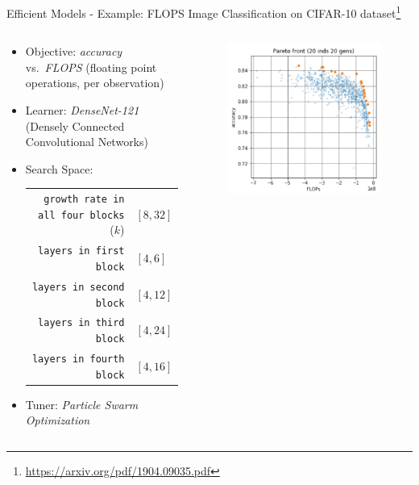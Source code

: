 \begin{frame}{Efficient Models - Example: FLOPS}
Image Classification on CIFAR-10 dataset\footnote{\url{https://arxiv.org/pdf/1904.09035.pdf}}
  \begin{columns}
  \begin{column}{0.65\textwidth}
    \begin{itemize}
      \item Objective: \emph{accuracy} vs.\ \emph{FLOPS} (floating point operations, per observation)
      \item Learner: \emph{DenseNet-121} (Densely Connected Convolutional Networks)
      \item Search Space:\\
        \begin{tabular}{rl}
          \texttt{growth rate in all four blocks} ($k$) & $[8,32]$ \\ %
          \texttt{layers in first block} & $[4, 6]$ \\
          \texttt{layers in second block} & $[4, 12] $ \\
          \texttt{layers in third block} & $[4, 24] $ \\
          \texttt{layers in fourth block} & $[4, 16] $ \\
        \end{tabular}
      \item Tuner: \emph{Particle Swarm Optimization}
    \end{itemize}
  \end{column}%
  \begin{column}{0.35\textwidth}
    \begin{figure}
    \includegraphics[width=\textwidth]{images/Wang_et_al_2019_Evolving_Deep_Neural_Networks_fig7_1.png}
    \end{figure}
  \end{column}
  \end{columns}


\end{frame}

